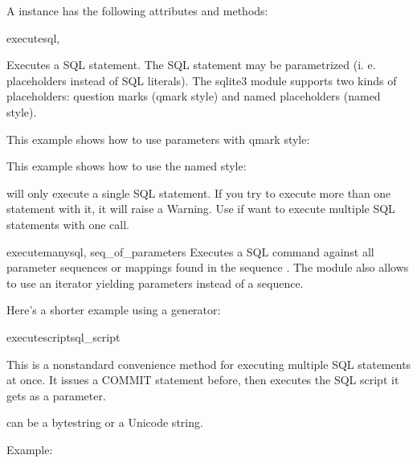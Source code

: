 A  instance has the following attributes and methods:

\begin{methoddesc}{execute}{sql, }

Executes a SQL statement. The SQL statement may be parametrized (i. e.
placeholders instead of SQL literals). The sqlite3 module supports two kinds of
placeholders: question marks (qmark style) and named placeholders (named
style).

This example shows how to use parameters with qmark style:

    

This example shows how to use the named style:

    

     will only execute a single SQL statement. If you try to
    execute more than one statement with it, it will raise a Warning. Use
     if want to execute multiple SQL statements with one
    call.
\end{methoddesc}


\begin{methoddesc}{executemany}{sql, seq_of_parameters}
Executes a SQL command against all parameter sequences or mappings found in the
sequence . The  module also allows
to use an iterator yielding parameters instead of a sequence.



Here's a shorter example using a generator:


\end{methoddesc}

\begin{methoddesc}{executescript}{sql_script}

This is a nonstandard convenience method for executing multiple SQL statements
at once. It issues a COMMIT statement before, then executes the SQL script it
gets as a parameter.

 can be a bytestring or a Unicode string.

Example:


\end{methoddesc}

